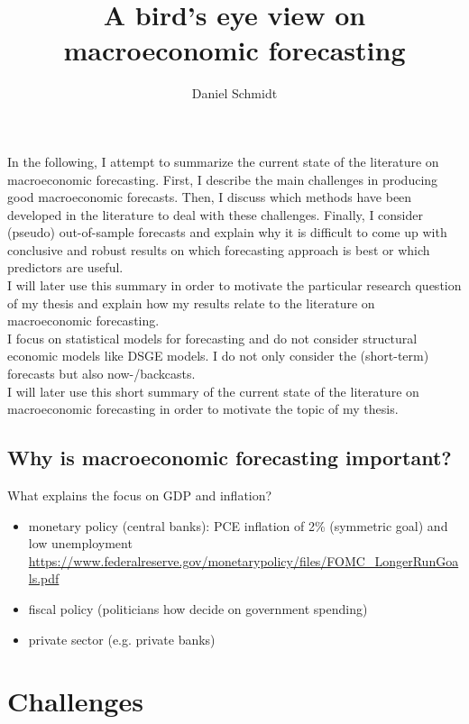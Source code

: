 \documentclass[12pt,a4paper]{scrartcl}
\title{A bird's eye view on macroeconomic forecasting}
\author{Daniel Schmidt}
\begin{document}
	
\maketitle

In the following, I attempt to summarize the current state of the literature on macroeconomic forecasting. First, I describe the main challenges in producing good macroeconomic forecasts. Then, I discuss which methods have been developed in the literature to deal with these challenges. Finally, I consider (pseudo) out-of-sample forecasts and explain why it is difficult to come up with conclusive and robust results on which forecasting approach is best or which predictors are useful.\\

I will later use this summary in order to motivate the particular research question of my thesis and explain how my results relate to the literature on macroeconomic forecasting.\\

I focus on statistical models for forecasting and do not consider structural economic models like DSGE models. I do not only consider the (short-term) forecasts but also now-/backcasts.\\

I will later use this short summary of the current state of the literature on macroeconomic forecasting in order to motivate the topic of my thesis.

\subsection*{Why is macroeconomic forecasting important?}

What explains the focus on GDP and inflation?

\begin{itemize}
	\item monetary policy (central banks): PCE inflation of 2\% (symmetric goal) and low unemployment \\ \url{https://www.federalreserve.gov/monetarypolicy/files/FOMC_LongerRunGoals.pdf}
	\item fiscal policy (politicians how decide on government spending)
	\item private sector (e.g. private banks)
\end{itemize}

\section{Challenges}
\end{document}
